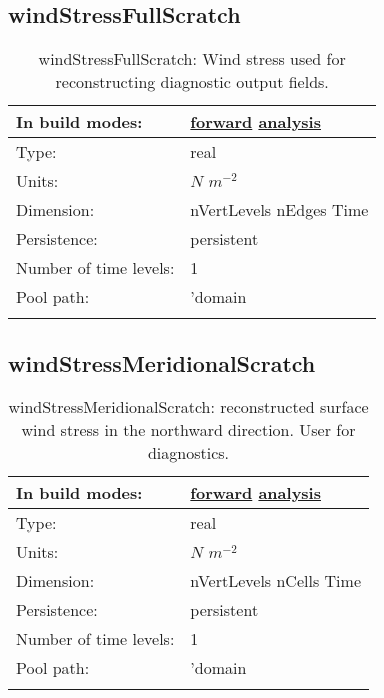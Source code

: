 \subsection[windStressFullScratch]{windStressFullScratch}
\label{subsec:var_sec_scratch_windStressFullScratch}
\begin{center}
\begin{longtable}{| p{2.0in} | p{4.0in} |}
        \hline 
        In build modes: & \hyperref[subsec:forward_var_tab_scratch]{forward} \hyperref[subsec:analysis_var_tab_scratch]{analysis} \\
        \hline 
        Type: & real \\
        \hline 
        Units: & $N$ $m^{-2}$ \\
        \hline 
        Dimension: & nVertLevels nEdges Time \\
        \hline 
        Persistence: & persistent \\
        \hline 
        Number of time levels: & 1 \\
        \hline 
            Pool path: & 'domain %
 \\
		 \hline 
    \caption{windStressFullScratch: Wind stress used for reconstructing diagnostic output fields.}
\end{longtable}
\end{center}
\subsection[windStressMeridionalScratch]{windStressMeridionalScratch}
\label{subsec:var_sec_scratch_windStressMeridionalScratch}
\begin{center}
\begin{longtable}{| p{2.0in} | p{4.0in} |}
        \hline 
        In build modes: & \hyperref[subsec:forward_var_tab_scratch]{forward} \hyperref[subsec:analysis_var_tab_scratch]{analysis} \\
        \hline 
        Type: & real \\
        \hline 
        Units: & $N$ $m^{-2}$ \\
        \hline 
        Dimension: & nVertLevels nCells Time \\
        \hline 
        Persistence: & persistent \\
        \hline 
        Number of time levels: & 1 \\
        \hline 
            Pool path: & 'domain %
 \\
		 \hline 
    \caption{windStressMeridionalScratch: reconstructed surface wind stress in the northward direction. User for diagnostics.}
\end{longtable}
\end{center}
